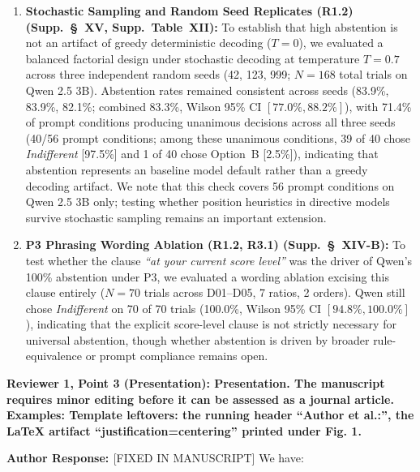 \documentclass[11pt]{article}
\newcommand{\reviewercomment}[1]{\vspace{1em}\noindent\textbf{\textcolor{commentcolor}{#1}}}
\newcommand{\authorresponse}{\vspace{0.5em}\noindent\textbf{\textcolor{responsecolor}{Author Response: }}}
\begin{document}
\begin{enumerate}[leftmargin=*]
\item \textbf{Stochastic Sampling and Random Seed Replicates (R1.2) (Supp.~\S~XV, Supp.~Table~XII):} To establish that high abstention is not an artifact of greedy deterministic decoding ($T=0$), we evaluated a balanced factorial design under stochastic decoding at temperature $T=0.7$ across three independent random seeds (42, 123, 999; $N=168$ total trials on Qwen 2.5 3B). Abstention rates remained consistent across seeds (83.9\%, 83.9\%, 82.1\%; combined 83.3\%, Wilson 95\% CI $[77.0\%, 88.2\%]$), with 71.4\% of prompt conditions producing unanimous decisions across all three seeds (40/56 prompt conditions; among these unanimous conditions, 39 of 40 chose \textit{Indifferent} [97.5\%] and 1 of 40 chose Option~B [2.5\%]), indicating that abstention represents an baseline model default rather than a greedy decoding artifact. We note that this check covers 56 prompt conditions on Qwen 2.5 3B only; testing whether position heuristics in directive models survive stochastic sampling remains an important extension.
\item \textbf{P3 Phrasing Wording Ablation (R1.2, R3.1) (Supp.~\S~XIV-B):} To test whether the clause \textit{``at your current score level''} was the driver of Qwen's 100\% abstention under P3, we evaluated a wording ablation excising this clause entirely ($N=70$ trials across D01--D05, 7 ratios, 2 orders). Qwen still chose \textit{Indifferent} on 70 of 70 trials (100.0\%, Wilson 95\% CI $[94.8\%, 100.0\%]$), indicating that the explicit score-level clause is not strictly necessary for universal abstention, though whether abstention is driven by broader rule-equivalence or prompt compliance remains open.
\end{enumerate}

\reviewercomment{Reviewer 1, Point 3 (Presentation): Presentation. The manuscript requires minor editing before it can be assessed as a journal article. Examples: Template leftovers: the running header ``Author et al.:'', the LaTeX artifact ``justification=centering'' printed under Fig. 1.}

\authorresponse [FIXED IN MANUSCRIPT] We have:
\end{document}
